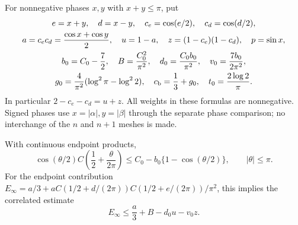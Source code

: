For nonnegative phases $x,y$ with $x+y\leq\pi$, put
\begin{equation}\label{scalar:phase-definitions}
 \begin{gathered}
 e=x+y,\quad d=x-y,\quad c_e=\cos(e/2),\quad c_d=\cos(d/2),\\
 a=c_ec_d=\frac{\cos x+\cos y}{2},\quad u=1-a,\quad
 z=(1-c_e)(1-c_d),\quad p=\sin x,\\
 b_0=C_0-\frac72,\quad B=\frac{C_0^2}{\pi^2},\quad
 d_0=\frac{C_0b_0}{\pi^2},\quad v_0=\frac{7b_0}{2\pi^2},\\
 g_0=\frac4{\pi^2}(\log^2\pi-\log^22),\quad
 c_{\rm b}=\frac13+g_0,\quad t_0=\frac{2\log2}{\pi}.
 \end{gathered}
\end{equation}
In particular $2-c_e-c_d=u+z$.  All weights in these formulas are
nonnegative.  Signed phases use $x=|\alpha|,y=|\beta|$ through the
separate phase comparison; no interchange of the $n$ and $n+1$ meshes
is made.

\begin{lemma}
\label{scalar:weighted-C}
With continuous endpoint products,
\begin{equation}\label{scalar:weighted-C-bound}
 \cos(\theta/2)C\left(\frac12+\frac\theta{2\pi}\right)
 \leq C_0-b_0\{1-\cos(\theta/2)\},\qquad |\theta|\leq\pi.
\end{equation}
For the endpoint contribution
$E_\infty=a/3+aC(1/2+d/(2\pi))C(1/2+e/(2\pi))/\pi^2$,
this implies the correlated estimate
\begin{equation}\label{scalar:endpoint-loss}
 E_\infty\leq\frac a3+B-d_0u-v_0z.
\end{equation}
\end{lemma}


